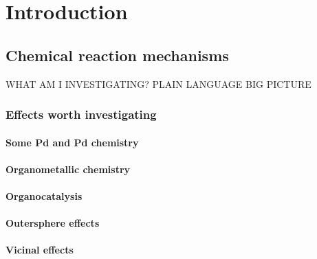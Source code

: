 \chapter{Introduction}%
\label{ch:introduction}

\section{Chemical reaction mechanisms}

WHAT AM I INVESTIGATING?\@
PLAIN LANGUAGE
BIG PICTURE

\subsection{Effects worth investigating}

\subsubsection{Some Pd and Pd chemistry}

\subsubsection{Organometallic chemistry}

\subsubsection{Organocatalysis}

\subsubsection{Outersphere effects}

\subsubsection{Vicinal effects}
